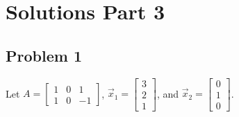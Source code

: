 \documentclass[11pt]{article}
\begin{document}
\clearpage

\section*{Solutions Part 3}
\subsection*{Problem 1}
Let $A=\begin{bmatrix}
    1 & 0 & 1\\ 1 & 0 & -1
\end{bmatrix}$, $\vec{x}_1=\begin{bmatrix} 3\\ 2 \\ 1\end{bmatrix}$, and $\vec{x}_2=\begin{bmatrix} 0\\ 1 \\ 0 \end{bmatrix}$.
\end{document}
